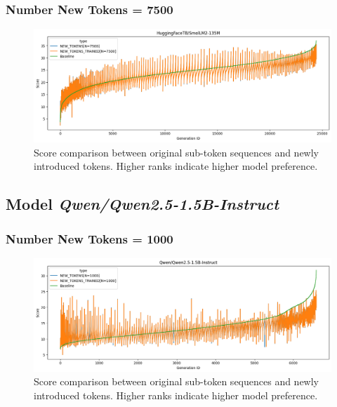 \subsubsection*{Number New Tokens = 7500}
\begin{figure}[H]
    \centering
    \includegraphics[width=\textwidth]{Figures/Appendix/token-rank-comparison_7500_smol135M.png}
    \caption{Score comparison between original sub-token sequences and newly introduced tokens. Higher ranks indicate higher model preference.}
    \label{fig:new_token_rank:7500_smol135M}
\end{figure}
\FloatBarrier


\subsection*{Model \textit{Qwen/Qwen2.5-1.5B-Instruct}}

\subsubsection*{Number New Tokens = 1000}
\begin{figure}[H]
    \centering
    \includegraphics[width=\textwidth]{Figures/Appendix/token-rank-comparison_1000_qwen.png}
    \caption{Score comparison between original sub-token sequences and newly introduced tokens. Higher ranks indicate higher model preference.}
    \label{fig:new_token_rank:1000_qwen}
\end{figure}
\FloatBarrier
